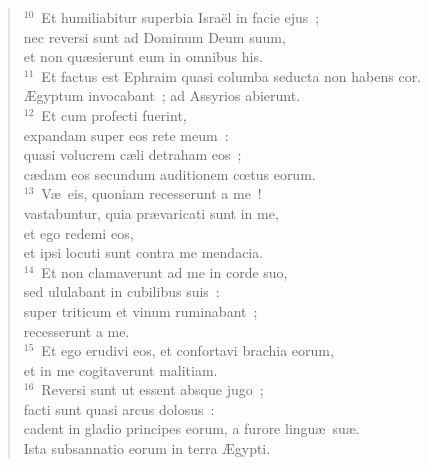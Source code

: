 \begin{flushleft}
\begin{verse}
${}^{10}$~Et humiliabitur superbia Isra\"el in facie ejus~;\\ nec reversi sunt ad Dominum Deum suum,\\ et non qu\ae sierunt eum in omnibus his.\\
${}^{11}$~Et factus est Ephraim quasi columba seducta non habens cor.\\ \AE gyptum invocabant~; ad Assyrios abierunt.\\
${}^{12}$~Et cum profecti fuerint,\\ expandam super eos rete meum~:\\ quasi volucrem c\ae li detraham eos~;\\ c\ae dam eos secundum auditionem cœtus eorum.\\
${}^{13}$~V\ae\ eis, quoniam recesserunt a me~!\\ vastabuntur, quia pr\ae varicati sunt in me,\\ et ego redemi eos,\\ et ipsi locuti sunt contra me mendacia.\\
${}^{14}$~Et non clamaverunt ad me in corde suo,\\ sed ululabant in cubilibus suis~:\\ super triticum et vinum ruminabant~;\\ recesserunt a me.\\
${}^{15}$~Et ego erudivi eos, et confortavi brachia eorum,\\ et in me cogitaverunt malitiam.\\
${}^{16}$~Reversi sunt ut essent absque jugo~;\\ facti sunt quasi arcus dolosus~:\\ cadent in gladio principes eorum, a furore lingu\ae\ su\ae .\\ Ista subsannatio eorum in terra \AE gypti.\end{verse}\end{flushleft}


